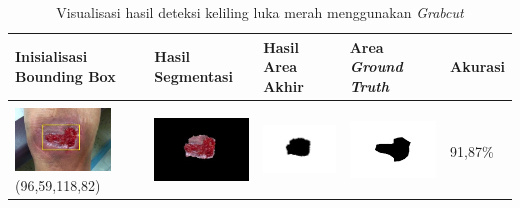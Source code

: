 \begin{table}[H]
\begin{tabular}{|m{1.0in}|m{1.0in}|m{1.0in}|m{1.0in}|m{0.6in}|}
	\end{tabular}
\end{table}

\begin{table}[H]
	\centering
	\caption{Visualisasi hasil deteksi keliling luka merah menggunakan \emph{Grabcut}}
	\label{tabel_hasil_15}
	\begin{tabular}{|m{1.0in}|m{1.0in}|m{1.0in}|m{1.0in}|m{0.6in}|}
		\hline
		\textbf{Inisialisasi Bounding Box} & \textbf{Hasil Segmentasi} & \textbf{Hasil Area Akhir} & \textbf{Area \emph{Ground Truth}} & \textbf{Akurasi} \\
		\hline
		
		&  &  & \\
		\includegraphics[width=1.0in]{gambar/hasil_segmentasi/luka_merah/image_29_rect.jpg} {\centering\fontsize{10}{10}\selectfont(96,59,118,82)}&
		\includegraphics[width=1.0in]{gambar/hasil_segmentasi/luka_merah/result_29.jpg}&
		\includegraphics[width=1.0in]{gambar/hasil_segmentasi/luka_merah/mask_r_29.jpg}&
		\includegraphics[width=1.0in]{gambar/hasil_segmentasi/luka_merah/29_r.jpg}&
		91,87\% \\
		\hline


\end{tabular}
\end{table}
